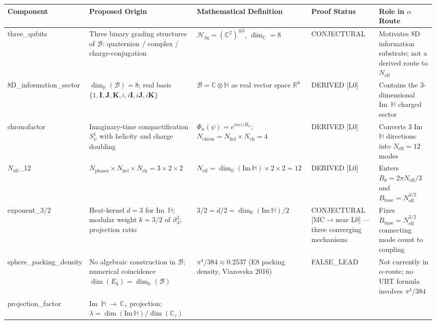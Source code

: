 \documentclass[12pt,a4paper]{article}
\theoremstyle{definition}
\theoremstyle{remark}
\begin{document}
\begin{longtable}{>{\raggedright}p{3.2cm}
                  >{\raggedright}p{3.5cm}
                  >{\raggedright}p{3.5cm}
                  >{\raggedright}p{2.2cm}
                  >{\raggedright\arraybackslash}p{2.8cm}}
\toprule
\textbf{Component} & \textbf{Proposed Origin} & \textbf{Mathematical Definition} & \textbf{Proof Status} & \textbf{Role in $\alpha$ Route} \\
\midrule
\endhead
three\_qubits
  & Three binary grading structures of $\mathcal{B}$: quaternion / complex / charge-conjugation
  & $\mathcal{H}_{3q} = (\mathbb{C}^2)^{\otimes 3}$, $\dim_\mathbb{C} = 8$
  & CONJECTURAL
  & Motivates 8D information substrate; not a derived route to $N_\mathrm{eff}$
  \\[4pt]
8D\_information\_sector
  & $\dim_\mathbb{R}(\mathcal{B}) = 8$; real basis $\{1,\mathbf{I},\mathbf{J},\mathbf{K},i,i\mathbf{I},i\mathbf{J},i\mathbf{K}\}$
  & $\mathcal{B} = \mathbb{C}\otimes\mathbb{H}$ as real vector space $\mathbb{R}^8$
  & DERIVED [L0]
  & Contains the 3-dimensional Im~$\mathbb{H}$ charged sector
  \\[4pt]
chronofactor
  & Imaginary-time compactification $S^1_\psi$ with helicity and charge doubling
  & $\Phi_n(\psi) = e^{in\psi/R_\psi}$; $N_\mathrm{chron} = N_\mathrm{hel}\times N_\mathrm{ch} = 4$
  & DERIVED [L0]
  & Converts 3 Im~$\mathbb{H}$ directions into $N_\mathrm{eff} = 12$ modes
  \\[4pt]
$N_\mathrm{eff}$\_12
  & $N_\mathrm{phases}\times N_\mathrm{hel}\times N_\mathrm{ch} = 3\times 2\times 2$
  & $N_\mathrm{eff} = \dim_\mathbb{R}(\mathrm{Im}\,\mathbb{H})\times 2\times 2 = 12$
  & DERIVED [L0]
  & Enters $B_0 = 2\pi N_\mathrm{eff}/3$ and $B_\mathrm{base} = N_\mathrm{eff}^{3/2}$
  \\[4pt]
exponent\_3/2
  & Heat-kernel $d=3$ for Im~$\mathbb{H}$; modular weight $k = 3/2$ of $\vartheta_3^3$; projection ratio
  & $3/2 = d/2 = \dim_\mathbb{R}(\mathrm{Im}\,\mathbb{H})/2$
  & CONJECTURAL [MC$\to$near L0] — three converging mechanisms
  & Fixes $B_\mathrm{base} = N_\mathrm{eff}^{3/2}$ connecting mode count to coupling
  \\[4pt]
sphere\_packing\_density
  & No algebraic construction in $\mathcal{B}$; numerical coincidence $\dim(E_8) = \dim_\mathbb{R}(\mathcal{B})$
  & $\pi^4/384 \approx 0.2537$ (E8 packing density, Viazovska 2016)
  & FALSE\_LEAD
  & Not currently in $\alpha$-route; no UBT formula involves $\pi^4/384$
  \\[4pt]
projection\_factor
  & Im~$\mathbb{H}\ \to\ \mathbb{C}_\tau$ projection; $\lambda = \dim(\mathrm{Im}\,\mathbb{H})/\dim(\mathbb{C}_\tau)$

\end{longtable}
\end{document}
